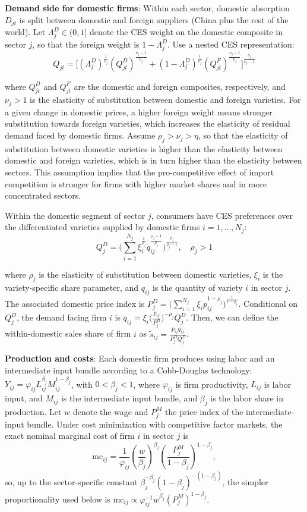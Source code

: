 \documentclass[12pt]{article}
\begin{document}
\textbf{Demand side for domestic firms}: Within each sector, domestic absorption $D_{jt}$ is split between domestic and foreign suppliers (China plus the rest of the world). Let $\Lambda_j^D \in (0,1]$ denote the CES weight on the domestic composite in sector $j$, so that the foreign weight is $1-\Lambda_j^D$. Use a nested CES representation:
$$Q_{jt} = \bigg[ (\Lambda_j^D)^{\frac{1}{\nu_j}} (Q_{jt}^D)^{\frac{\nu_j-1}{\nu_j}} + (1-\Lambda_j^D)^{\frac{1}{\nu_j}} (Q_{jt}^F)^{\frac{\nu_j-1}{\nu_j}} \bigg]^{\frac{\nu_j}{\nu_j-1}}$$

where $Q_{jt}^D$ and $Q_{jt}^F$ are the domestic and foreign composites, respectively, and $\nu_j > 1$ is the elasticity of substitution between domestic and foreign varieties. For a given change in domestic prices, a higher foreign weight means stronger substitution towards foreign varieties, which increases the elasticity of residual demand faced by domestic firms. Assume $\rho_j > \nu_j > \eta$, so that the elasticity of substitution between domestic varieties is higher than the elasticity between domestic and foreign varieties, which is in turn higher than the elasticity between sectors. This assumption implies that the pro-competitive effect of import competition is stronger for firms with higher market shares and in more concentrated sectors.

Within the domestic segment of sector $j$, consumers have CES preferences over the differentiated varieties supplied by domestic firms $i = 1, ..., N_j$:
\[Q_{j}^D = \Bigg(\sum_{i=1}^{N_j} \xi_i^{\frac{1}{\rho_j}} q_{ij}^{\frac{\rho_j-1}{\rho_j}} \Bigg)^{\frac{\rho_j}{\rho_j-1}}, \quad \rho_j > 1\]

where $\rho_j$ is the elasticity of substitution between domestic varieties, $\xi_i$ is the variety-specific share parameter, and $q_{ij}$ is the quantity of variety $i$ in sector $j$. The associated domestic price index is $P_j^D = \bigg(\sum_{i=1}^{N_j} \xi_i p_{ij}^{1-\rho_j} \bigg)^{\frac{1}{1-\rho_j}}$. Conditional on $Q_j^D$, the demand facing firm $i$ is $q_{ij} = \xi_i \bigg(\frac{p_{ij}}{P_j^D}\bigg)^{-\rho_j} Q_j^D$. Then, we can define the within-domestic sales share of firm $i$ as $\tilde{s}_{ij} = \frac{p_{ij} q_{ij}}{P_{j}^D Q_{j}^D}$.

\textbf{Production and costs}: Each domestic firm produces using labor and an intermediate input bundle according to a Cobb-Douglas technology: $Y_{ij} = \varphi_{ij} L_{ij}^{\beta_j} M_{ij}^{1-\beta_j}$, with $0 < \beta_j < 1$, where $\varphi_{ij}$ is firm productivity, $L_{ij}$ is labor input, and $M_{ij}$ is the intermediate input bundle, and $\beta_j$ is the labor share in production. Let $w$ denote the wage and $P^M_j$ the price index of the intermediate-input bundle. Under cost minimization with competitive factor markets, the exact nominal marginal cost of firm $i$ in sector $j$ is
\[
\text{mc}_{ij}
=
\frac{1}{\varphi_{ij}}
\left( \frac{w}{\beta_j} \right)^{\beta_j}
\left( \frac{P^M_j}{1-\beta_j} \right)^{1-\beta_j},
\]
so, up to the sector-specific constant $\beta_j^{-\beta_j}(1-\beta_j)^{-(1-\beta_j)}$, the simpler proportionality used below is $\text{mc}_{ij} \propto \varphi_{ij}^{-1} w^{\beta_j} (P^M_j)^{1-\beta_j}$.
\end{document}
